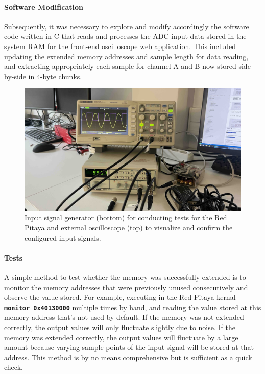 
\paragraph{Software Modification}

Subsequently, it was necessary to explore and modify accordingly the software code written in C that reads and processes the ADC input data stored in the system RAM for the front-end oscilloscope web application. This included updating the extended memory addresses and sample length for data reading, and extracting appropriately each sample for channel A and B now stored side-by-side in 4-byte chunks.

\begin{figure}[ht]
    \centering
    \includegraphics[width=0.75\columnwidth]{images/chapter_2/signal_generator.jpeg}
    \caption{Input signal generator (bottom) for conducting tests for the Red Pitaya and external oscilloscope (top) to visualize and confirm the configured input signals.}
    \label{fig:ch2_signal_generator}
\end{figure}


\paragraph{Tests}

A simple method to test whether the memory was successfully extended is to monitor the memory addresses that were previously unused consecutively and observe the value stored. For example, executing in the Red Pitaya kernal \textbf{\texttt{monitor 0x40130000}} multiple times by hand, and reading the value stored at this memory address that's not used by default. If the memory was not extended correctly, the output values will only fluctuate slightly due to noise. If the memory was extended correctly, the output values will fluctuate by a large amount because varying sample points of the input signal will be stored at that address. This method is by no means comprehensive but is sufficient as a quick check.

